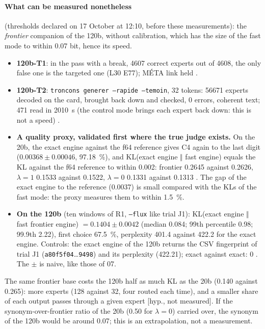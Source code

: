 \paragraph{What can be measured nonetheless} (thresholds declared on 17 October at 12:10, before these measurements): the \emph{frontier} companion of the 120b, without calibration, which has the size of the fast mode to within 0.07 bit, hence its speed.
\begin{itemize}
\item \textbf{120b-T1}: in the pass with a break, \num{4607} correct experts out of \num{4608}, the only false one is the targeted one (L30 E77); MÉTA link held \mes.
\item \textbf{120b-T2}: \texttt{troncons generer --rapide --temoin}, 32 tokens: \num{56671} experts decoded on the card, brought back down and checked, 0 errors, coherent text; \SI{471}{\Go} read in \SI{2010}{\second} (the control mode brings each expert back down: this is not a speed) \mes.
\item \textbf{A quality proxy, validated first where the true judge exists.} On the 20b, the exact engine against the f64 reference gives C4 again to the last digit ($\num{0.00368} \pm \num{0.00046}$, \SI{97.18}{\percent}), and KL(exact engine $\Vert$ fast engine) equals the KL against the f64 reference to within \num{0.002}: frontier \num{0.2645} against \num{0.2626}, $\lambda = 1$ \num{0.1533} against \num{0.1522}, $\lambda = 0$ \num{0.1331} against \num{0.1313} \mes. The gap of the exact engine to the reference (\num{0.0037}) is small compared with the KLs of the fast mode: the proxy measures them to within \SI{1.5}{\percent}.
\item \textbf{On the 120b} (ten windows of R1, \texttt{--flux} like trial J1): KL(exact engine $\Vert$ fast frontier engine) $= \num{0.1404} \pm \num{0.0042}$ (median \num{0.084}; 99th percentile \num{0.98}; 99.9th \num{2.22}), first choice \SI{67.5}{\percent}, perplexity \num{401.4} against \num{422.2} for the exact engine. Controls: the exact engine of the 120b returns the CSV fingerprint of trial J1 (\texttt{a80f5f04}…\texttt{9498}) and its perplexity (\num{422.21}); exact against exact: 0 \mes. The $\pm$ is naive, like those of 07.
\end{itemize}
The same frontier base costs the 120b half as much KL as the 20b (\num{0.140} against \num{0.265}): more experts (128 against 32, four routed each time), and a smaller share of each output passes through a given expert [hyp., not measured]. If the synonym-over-frontier ratio of the 20b (\num{0.50} for $\lambda = 0$) carried over, the synonym of the 120b would be around \num{0.07}; this is an extrapolation, not a measurement.

